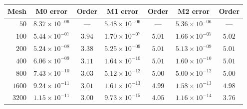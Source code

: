 \begin{tabular}{|r||c|c||c|c||c|c|}
\hline
\bf{Mesh} & \bf{M0 error} & \bf{Order} & \bf{M1 error} & \bf{Order} & \bf{M2 error} & \bf{Order}\\
\hline
\hline
$  50$ & $8.37\times 10^{-06}$ & --- & $5.48\times 10^{-06}$ & --- & $5.36\times 10^{-06}$ & ---\\
\hline
$ 100$ & $5.44\times 10^{-07}$ & $3.94$ & $1.70\times 10^{-07}$ & $5.01$ & $1.66\times 10^{-07}$ & $5.02$\\
\hline
$ 200$ & $5.24\times 10^{-08}$ & $3.38$ & $5.25\times 10^{-09}$ & $5.01$ & $5.13\times 10^{-09}$ & $5.01$\\
\hline
$ 400$ & $6.06\times 10^{-09}$ & $3.11$ & $1.64\times 10^{-10}$ & $5.01$ & $1.60\times 10^{-10}$ & $5.01$\\
\hline
$ 800$ & $7.43\times 10^{-10}$ & $3.03$ & $5.12\times 10^{-12}$ & $5.00$ & $5.00\times 10^{-12}$ & $5.00$\\
\hline
$1600$ & $9.24\times 10^{-11}$ & $3.01$ & $1.61\times 10^{-13}$ & $4.99$ & $1.58\times 10^{-13}$ & $4.98$\\
\hline
$3200$ & $1.15\times 10^{-11}$ & $3.00$ & $9.73\times 10^{-15}$ & $4.05$ & $1.16\times 10^{-14}$ & $3.76$\\
\hline
\end{tabular}
